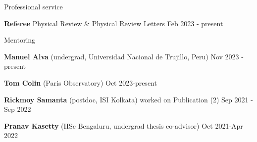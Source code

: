 \documentclass{resume} %
\begin{document}
\iffalse


\begin{rSection}{Contributed talks}



APS April Meeting 2022, New York (planned)  \hfill Apr 2022

Midwest Relativity Meeting (UIUC)      \hfill Nov 2021

APS April Meeting 2021 (online) \hfill Apr 2021

APS April Meeting 2020 (online) \hfill Apr 2020





\end{rSection}

\fi



\begin{rSection}{Professional service}


{\bf Referee } Physical Review \& Physical Review Letters   \hfill Feb 2023 - present

\end{rSection}




\begin{rSection}{Mentoring}


{\bf Manuel Alva}    {\footnotesize  (undergrad, Universidad Nacional de Trujillo, Peru)}                   \hfill Nov 2023 - present


{\bf Tom Colin}         {\footnotesize  (Paris Observatory)}                                       \hfill Oct 2023-present


{\bf Rickmoy Samanta}    {\footnotesize  (postdoc, ISI Kolkata)} worked on Publication (2)                           \hfill Sep 2021 - Sep 2022


{\bf Pranav Kasetty}  {\footnotesize  (IISc Bengaluru, undergrad thesis co-advisor)}                                       \hfill Oct 2021-Apr 2022  

\end{rSection}
\end{document}
